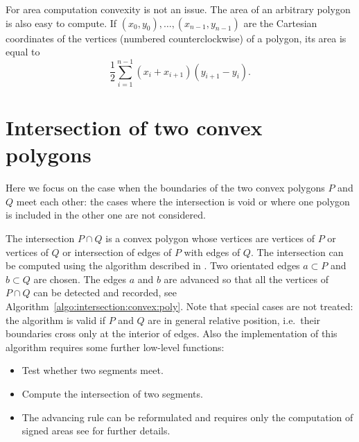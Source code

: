 For area computation convexity is not an issue. The area of an
arbitrary polygon is also easy to compute. If
$(x_0,y_0),\ldots,(x_{n-1},y_{n-1})$ are the Cartesian coordinates of
the vertices (numbered counterclockwise) of a polygon, its area is
equal to
\begin{equation}
  \label{eq:area:any:polygon}
  \frac{1}{2}\sum_{i=1}^{n-1} (x_i+x_{i+1})(y_{i+1}-y_i).
\end{equation}

\section{Intersection of two convex polygons}
\label{sec:calcul:intersection}


Here we focus on the case when the boundaries of the two convex
polygons $P$ and $Q$ meet each other: the cases where the intersection
is void or where one polygon is included in the other one are not
considered.

The intersection $P\cap Q$ is a convex polygon whose vertices are
vertices of $P$ or vertices of $Q$ or intersection of edges of $P$
with edges of $Q$. The intersection can be computed using the
algorithm described in \cite[Section 7.6]{ORourke:1998}. Two orientated
edges $a\subset P$ and $b\subset Q$ are chosen. The edges $a$ and $b$
are advanced so  that all the vertices of $P\cap Q$
can be detected and recorded, see
Algorithm~\ref{algo:intersection:convex:poly}. Note that special cases
are not treated: the algorithm is valid if $P$ and $Q$ are in general
relative position, i.e.\ their boundaries cross only at the interior
of edges. Also the implementation of this algorithm requires some
further low-level functions:
\begin{itemize}
\item Test whether two segments meet.
\item Compute the intersection of two segments.
\item The advancing rule can be reformulated and requires only the
  computation of signed areas see \cite[Section 7.6]{ORourke:1998} for
  further details.
\end{itemize}

